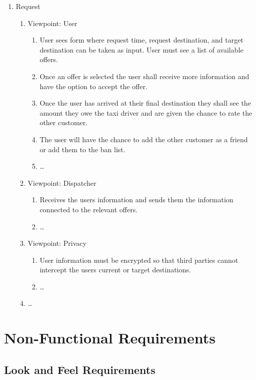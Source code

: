 \documentclass[english]{article}
\begin{document}
\begin{enumerate}[{BE}1.]
	\item Request		
	\begin{enumerate}[{VP1}.1]
		\item Viewpoint: User
			\begin{enumerate}
				\item User sees form where request time, request destination, and target destination can be taken as input. User must see a list of available offers. 
				\item Once an offer is selected the user shall receive more information and have the option to accept the offer. 
				\item Once the user has arrived at their final destination they shall see the amount they owe the taxi driver and are given the chance to rate the other customer. 
				\item The user will have the chance to add the other customer as a friend or add them to the ban list. 
				\item \dots
			\end{enumerate}
		\item Viewpoint: Dispatcher
			\begin{enumerate}
				\item Receives the users information and sends them the information connected to the relevant offers.
				\item \dots
			\end{enumerate}
		\item Viewpoint: Privacy
			\begin{enumerate}
				\item User information must be encrypted so that third parties cannot intercept the users current or target destinations.
				\item \dots
			\end{enumerate}
		\item \dots

	\end{enumerate}
\end{enumerate}


\section{Non-Functional Requirements}
\label{sec:non-functional_requirements}
\subsection{Look and Feel Requirements}
\label{sub:look_and_feel_requirements}
\end{document}
